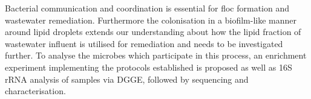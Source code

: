 \documentclass[11pt]{article}
\begin{document}
Bacterial communication and coordination is essential for floc formation and wastewater remediation. Furthermore the colonisation in a biofilm-like manner around lipid droplets extends our understanding about how the lipid fraction of wastewater influent is utilised for remediation and needs to be investigated further. To analyse the microbes which participate in this process, an enrichment experiment implementing the protocols established is proposed as well as 16S rRNA analysis of samples via DGGE, followed by sequencing and characterisation. 
\end{document}
